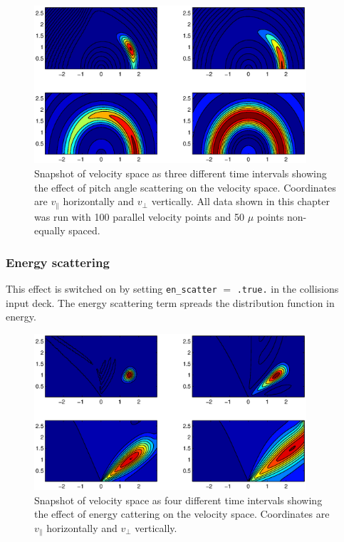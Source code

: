 \documentclass{report}
\begin{document}
\begin{figure}
\begin{center}
\includegraphics[width=0.9\textwidth]{pitchangle.eps}
\caption{Snapshot of velocity space as three different time intervals showing the effect of pitch angle scattering on the velocity space.  Coordinates are $v_{\parallel}$ horizontally and $v_{\perp}$ vertically. All data shown in this chapter was run with 100 parallel velocity points and 50 $\mu$ points non-equally spaced.\label{pitch-angle}}
\end{center}
\end{figure}

\subsubsection{Energy scattering}

This effect is switched on by setting \texttt{en\_scatter} $=$ \texttt{.true.} in the collisions input deck.  The energy scattering term spreads the distribution function in energy.

\begin{figure}[h!]
\begin{center}
\includegraphics[width=0.9\textwidth]{enscatter.eps}
\caption{Snapshot of velocity space as four different time intervals showing the effect of energy cattering on the velocity space. Coordinates are $v_{\parallel}$ horizontally and $v_{\perp}$ vertically. }
\end{center}
\end{figure}
\end{document}
